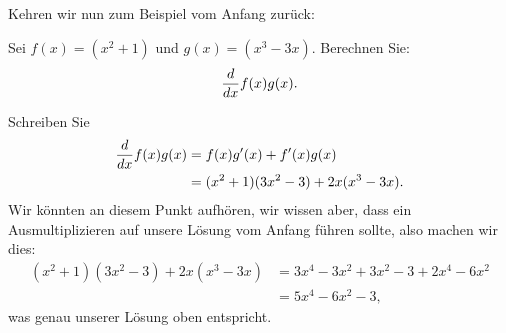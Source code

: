 Kehren wir nun zum Beispiel vom Anfang zurück:
\begin{example} 
Sei $f(x)=(x^2+1)$ und $g(x)=(x^3-3x)$. Berechnen Sie:
\[
\frac{d}{dx} f(x)g(x).
\]
\end{example}
\begin{solution}
Schreiben Sie
\begin{align*}
\frac{d}{dx} f(x)g(x) &= f(x)g'(x) + f'(x)g(x)\\
&=(x^2+1)(3x^2-3) + 2x(x^3-3x).
\end{align*}
Wir könnten an diesem Punkt aufhören, wir wissen aber, dass ein Ausmultiplizieren auf unsere Lösung vom Anfang führen sollte, also machen wir dies:
\begin{align*}
(x^2+1)(3x^2-3) + 2x(x^3-3x) &= 3x^4-3x^2 +3x^2 -3 + 2x^4-6x^2\\
&=5x^4-6x^2-3,
\end{align*}
was genau unserer Lösung oben entspricht.
\end{solution}




